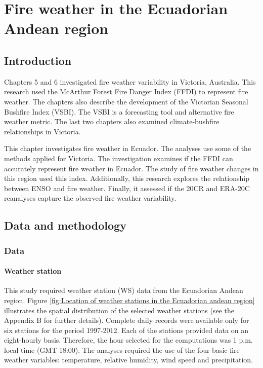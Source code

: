 
\chapter{Fire weather in the Ecuadorian Andean region}
\newpage{}


\section{Introduction}

Chapters 5 and 6 investigated fire weather variability in Victoria,
Australia. This research used the McArthur Forest Fire Danger Index
(FFDI) to represent fire weather. The chapters also describe the development
of the Victorian Seasonal Bushfire Index (VSBI). The VSBI is a forecasting
tool and alternative fire weather metric. The last two chapters also
examined climate-bushfire relationships in Victoria.

This chapter investigates fire weather in Ecuador. The analyses use
some of the methods applied for Victoria. The investigation examines
if the FFDI can accurately represent fire weather in Ecuador. The
study of fire weather changes in this region used this index. Additionally,
this research explores the relationship between ENSO and fire weather.
Finally, it assessed if the 20CR and ERA-20C reanalyses capture the
observed fire weather variability. 


\section{Data and methodology}


\subsection{Data}


\subsubsection{Weather station}

This study required weather station (WS) data from the Ecuadorian
Andean region. Figure \ref{fig:Location of weather stations in the Ecuadorian andean region}
illustrates the spatial distribution of the selected weather stations
(see the Appendix B for further details). Complete daily records were
available only for six stations for the period 1997-2012. Each of
the stations provided data on an eight-hourly basis. Therefore, the
hour selected for the computations was 1 p.m. local time (GMT 18:00).
The analyses required the use of the four basic fire weather variables:
temperature, relative humidity, wind speed and precipitation. 

